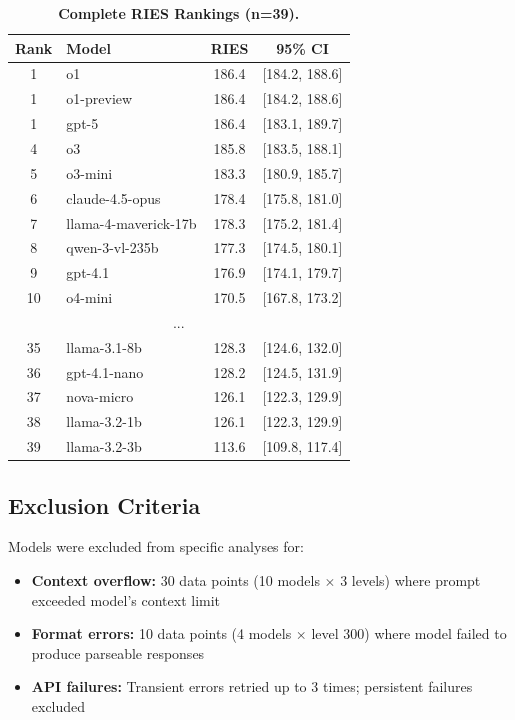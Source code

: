 \documentclass{article}
\begin{document}
\begin{table}[t]
\centering
\small
\caption{\textbf{Complete RIES Rankings (n=39).}}
\label{tab:ries_rankings}
\begin{tabular}{clcc}
\toprule
Rank & Model & RIES & 95\% CI \\
\midrule
1 & o1 & 186.4 & [184.2, 188.6] \\
1 & o1-preview & 186.4 & [184.2, 188.6] \\
1 & gpt-5 & 186.4 & [183.1, 189.7] \\
4 & o3 & 185.8 & [183.5, 188.1] \\
5 & o3-mini & 183.3 & [180.9, 185.7] \\
6 & claude-4.5-opus & 178.4 & [175.8, 181.0] \\
7 & llama-4-maverick-17b & 178.3 & [175.2, 181.4] \\
8 & qwen-3-vl-235b & 177.3 & [174.5, 180.1] \\
9 & gpt-4.1 & 176.9 & [174.1, 179.7] \\
10 & o4-mini & 170.5 & [167.8, 173.2] \\
\multicolumn{4}{c}{...} \\
35 & llama-3.1-8b & 128.3 & [124.6, 132.0] \\
36 & gpt-4.1-nano & 128.2 & [124.5, 131.9] \\
37 & nova-micro & 126.1 & [122.3, 129.9] \\
38 & llama-3.2-1b & 126.1 & [122.3, 129.9] \\
39 & llama-3.2-3b & 113.6 & [109.8, 117.4] \\
\bottomrule
\end{tabular}
\end{table}

\subsection{Exclusion Criteria}

Models were excluded from specific analyses for:
\begin{itemize}[itemsep=2pt,topsep=3pt,parsep=0pt]
    \item \textbf{Context overflow:} 30 data points (10 models $\times$ 3 levels) where prompt exceeded model's context limit
    \item \textbf{Format errors:} 10 data points (4 models $\times$ level 300) where model failed to produce parseable responses
    \item \textbf{API failures:} Transient errors retried up to 3 times; persistent failures excluded
\end{itemize}
\end{document}
